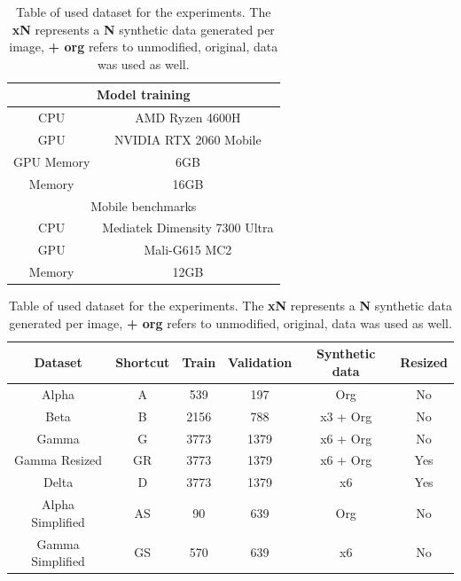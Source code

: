 \begin{table}[hbt]
\caption{Used hardware for experiments.}
\centering
\label{hardwareConfiguration}
\begin{tabular}{|cc|}
\hline
\multicolumn{2}{|c|}{Model training}                            \\ \hline
\multicolumn{1}{|c|}{CPU}        & AMD Ryzen 4600H               \\ \hline
\multicolumn{1}{|c|}{GPU}        & NVIDIA RTX 2060 Mobile        \\ \hline
\multicolumn{1}{|c|}{GPU Memory} & 6GB                           \\ \hline
\multicolumn{1}{|c|}{Memory}     & 16GB                          \\ \hline
\multicolumn{2}{|c|}{Mobile benchmarks}                          \\ \hline
\multicolumn{1}{|c|}{CPU}        & Mediatek Dimensity 7300 Ultra \\ \hline
\multicolumn{1}{|c|}{GPU}        & Mali-G615 MC2                 \\ \hline
\multicolumn{1}{|c|}{Memory}     & 12GB                          \\ \hline
\end{tabular}
\label{datasetTable}
\caption{Table of used dataset for the experiments. The \textbf{xN} represents a \textbf{N} synthetic data generated per image, \textbf{+ org} refers to unmodified, original, data was used as well.}
\centering
\begin{tabular}{|c|c|c|c|c|c|}
\hline
Dataset       & Shortcut & Train & Validation & Synthetic data & Resized \\ \hline
Alpha         & A        & 539   & 197        & Org        & No\\ \hline
Beta          & B        & 2156  & 788        & x3 + Org   & No\\ \hline
Gamma         & G        & 3773  & 1379       & x6 + Org   & No\\ \hline
Gamma Resized & GR       & 3773  & 1379       & x6 + Org   & Yes\\ \hline
Delta         & D        & 3773  & 1379       & x6         & Yes\\ \hline
Alpha Simplified & AS       & 90    & 639     & Org        & No\\ \hline
Gamma Simplified & GS       & 570   & 639     & x6         & No\\ \hline
\end{tabular}
\end{table}


